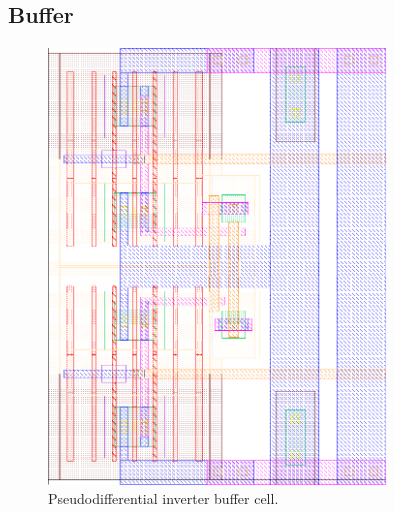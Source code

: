 		\subsection{Buffer}\label{sec:lay_buff}
			\begin{figure}[htb!]
			        \centering
			        \includegraphics[width=0.8\textwidth, angle=0]{./figs/layout/layout_buffer}
			    \caption{Pseudodifferential inverter buffer cell.}
			\end{figure}
		\FloatBarrier\pagebreak

